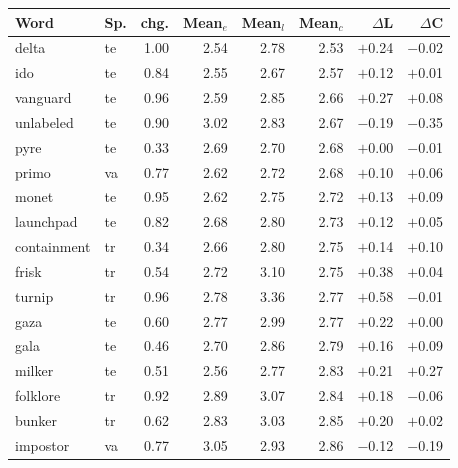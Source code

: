 \begin{minipage}[t]{0.49\linewidth}\centering
\begin{tabular}{@{}llrrrrrr@{}}
\toprule
Word & Sp. & chg. & Mean$_e$ & Mean$_l$ & Mean$_c$ & $\Delta$L & $\Delta$C \\
\midrule
delta & te & 1.00 & 2.54 & 2.78 & 2.53 & $+$0.24 & $-$0.02 \\
ido & te & 0.84 & 2.55 & 2.67 & 2.57 & $+$0.12 & $+$0.01 \\
vanguard & te & 0.96 & 2.59 & 2.85 & 2.66 & $+$0.27 & $+$0.08 \\
unlabeled & te & 0.90 & 3.02 & 2.83 & 2.67 & $-$0.19 & $-$0.35 \\
pyre & te & 0.33 & 2.69 & 2.70 & 2.68 & $+$0.00 & $-$0.01 \\
primo & va & 0.77 & 2.62 & 2.72 & 2.68 & $+$0.10 & $+$0.06 \\
monet & te & 0.95 & 2.62 & 2.75 & 2.72 & $+$0.13 & $+$0.09 \\
launchpad & te & 0.82 & 2.68 & 2.80 & 2.73 & $+$0.12 & $+$0.05 \\
containment & tr & 0.34 & 2.66 & 2.80 & 2.75 & $+$0.14 & $+$0.10 \\
frisk & tr & 0.54 & 2.72 & 3.10 & 2.75 & $+$0.38 & $+$0.04 \\
turnip & tr & 0.96 & 2.78 & 3.36 & 2.77 & $+$0.58 & $-$0.01 \\
gaza & te & 0.60 & 2.77 & 2.99 & 2.77 & $+$0.22 & $+$0.00 \\
gala & te & 0.46 & 2.70 & 2.86 & 2.79 & $+$0.16 & $+$0.09 \\
milker & te & 0.51 & 2.56 & 2.77 & 2.83 & $+$0.21 & $+$0.27 \\
folklore & tr & 0.92 & 2.89 & 3.07 & 2.84 & $+$0.18 & $-$0.06 \\
bunker & tr & 0.62 & 2.83 & 3.03 & 2.85 & $+$0.20 & $+$0.02 \\
impostor & va & 0.77 & 3.05 & 2.93 & 2.86 & $-$0.12 & $-$0.19 \\
\bottomrule
\end{tabular}
\end{minipage}\hfill
